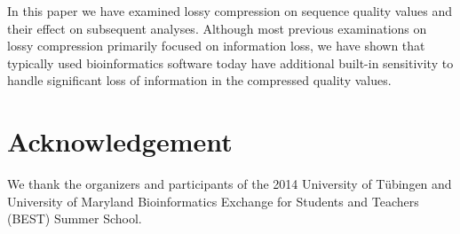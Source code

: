 \documentclass{bioinfo}
\begin{document}
In this paper we have examined lossy compression on sequence quality values and their effect on subsequent analyses. Although most previous examinations on lossy compression primarily focused on information loss, we have shown that typically used bioinformatics software today have additional built-in sensitivity to handle significant loss of information in the compressed quality values.


\section*{Acknowledgement}
We thank the organizers and participants of the 2014 University of T\"{u}bingen and University of Maryland Bioinformatics Exchange for Students and Teachers (BEST) Summer School.

%
%
%
%
%
%

%

\end{document}
